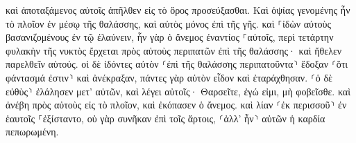 \documentclass{openreader}
\begin{document}
καὶ ἀποταξάμενος αὐτοῖς ἀπῆλθεν εἰς τὸ ὄρος προσεύξασθαι. 
Καὶ ὀψίας γενομένης ἦν τὸ πλοῖον ἐν μέσῳ τῆς θαλάσσης, καὶ αὐτὸς μόνος ἐπὶ τῆς γῆς. 
καὶ ⸀ἰδὼν αὐτοὺς βασανιζομένους ἐν τῷ ἐλαύνειν, ἦν γὰρ ὁ ἄνεμος ἐναντίος ⸀αὐτοῖς, περὶ τετάρτην φυλακὴν τῆς νυκτὸς ἔρχεται πρὸς αὐτοὺς περιπατῶν ἐπὶ τῆς θαλάσσης· καὶ ἤθελεν παρελθεῖν αὐτούς. 
οἱ δὲ ἰδόντες αὐτὸν ⸂ἐπὶ τῆς θαλάσσης περιπατοῦντα⸃ ἔδοξαν ⸂ὅτι φάντασμά ἐστιν⸃ καὶ ἀνέκραξαν, 
πάντες γὰρ αὐτὸν εἶδον καὶ ἐταράχθησαν. ⸂ὁ δὲ εὐθὺς⸃ ἐλάλησεν μετ’ αὐτῶν, καὶ λέγει αὐτοῖς· Θαρσεῖτε, ἐγώ εἰμι, μὴ φοβεῖσθε. 
καὶ ἀνέβη πρὸς αὐτοὺς εἰς τὸ πλοῖον, καὶ ἐκόπασεν ὁ ἄνεμος. καὶ λίαν ⸂ἐκ περισσοῦ⸃ ἐν ἑαυτοῖς ⸀ἐξίσταντο, 
οὐ γὰρ συνῆκαν ἐπὶ τοῖς ἄρτοις, ⸂ἀλλ’ ἦν⸃ αὐτῶν ἡ καρδία πεπωρωμένη. 
\end{document}

